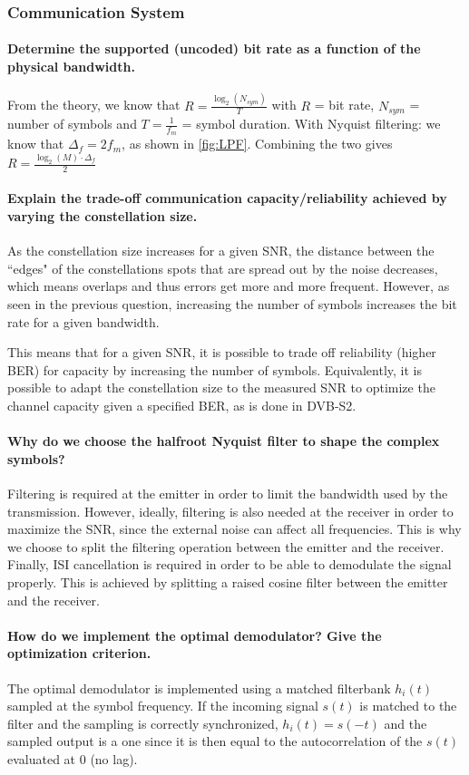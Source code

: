 \subsubsection{Communication System}
\paragraph{Determine the supported (uncoded) bit rate as a function of the physical bandwidth.} From the theory, we know that $R = \frac{\log_2(N_{sym})}{T}$ with $R$ = bit rate, $N_{sym}$ = number of symbols and $T = \frac{1}{f_m}$ = symbol duration.
With Nyquist filtering: we know that $\Delta_f = 2f_m$, as shown in \ref{fig:LPF}.
Combining the two gives $R = \frac{\log_2(M)\cdot\Delta_f}{2}$

\paragraph{Explain the trade-off communication capacity/reliability achieved by varying the constellation size.}
As the constellation size increases for a given SNR, the distance between the ``edges" of the constellations spots that are spread out by the noise decreases, which means overlaps and thus errors get more and more frequent.
However, as seen in the previous question, increasing the number of symbols increases the bit rate for a given bandwidth.

This means that for a given SNR, it is possible to trade off reliability (higher BER) for capacity by increasing the number of symbols. Equivalently, it is possible to adapt the constellation size to the measured SNR to optimize the channel capacity given a specified BER, as is done in DVB-S2.

\paragraph{Why do we choose the halfroot Nyquist filter to shape the complex symbols?}
Filtering is required at the emitter in order to limit the bandwidth used by the transmission.
However, ideally, filtering is also needed at the receiver in order to maximize the SNR, since the external noise can affect all frequencies.
This is why we choose to split the filtering operation between the emitter and the receiver.
Finally, ISI cancellation is required in order to be able to demodulate the signal properly.
This is achieved by splitting a raised cosine filter between the emitter and the receiver.

\paragraph{How do we implement the optimal demodulator? Give the optimization criterion.}
The optimal demodulator is implemented using a matched filterbank $h_i(t)$ sampled at the symbol frequency. If the incoming signal $s(t)$ is matched to the filter and the sampling is correctly synchronized,  $h_i(t) = s(-t)$ and the sampled output is a one since it is then equal to the autocorrelation of the $s(t)$ evaluated at $0$ (no lag).

